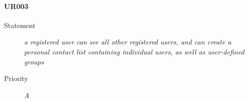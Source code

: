 \paragraph{UR003}
\begin{description}
  \item [Statement] 
    \textit{ a registered user can see all other registered users, and can create a personal contact list containing individual users, as well as user-defined groups}
  \item [Priority] \textit{A}
\end{description}


